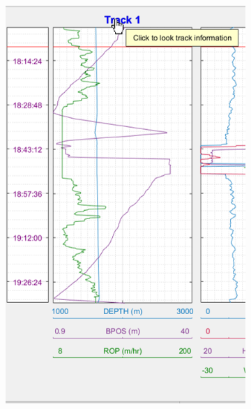 \documentclass[12pt,a4paper,oneside]{report}
\begin{document}
\begin{figure}[H]
\centering
  \begin{subfigure}[b]{0.4\textwidth}
    \includegraphics[width=\textwidth]{track_des_1.png}
    \caption{}
  \end{subfigure}
   \hfill
  \begin{subfigure}[b]{0.55\textwidth}

\end{subfigure}
\end{figure}
\end{document}
